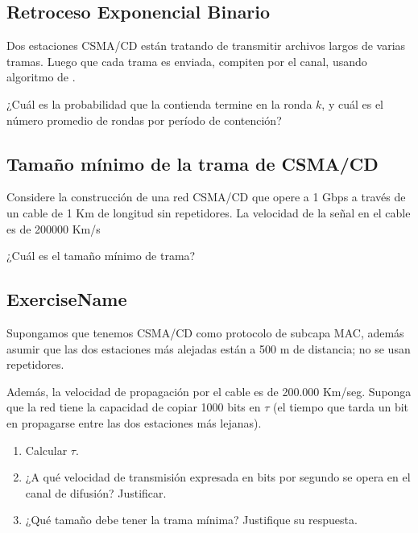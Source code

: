 \documentclass[12pt]{report}
\begin{document}
\begin{exer}
\subsection{Retroceso Exponencial Binario \sthree}
Dos estaciones CSMA/CD están tratando de transmitir archivos largos de varias tramas. Luego que cada trama es enviada, compiten por el canal, usando algoritmo de .

¿Cuál es la probabilidad que la contienda termine en la ronda $k$, y cuál es el número promedio de rondas por período de contención?
\end{exer}

\begin{exer}
\subsection{Tamaño mínimo de la trama de CSMA/CD \sthree}
Considere la construcción de una red CSMA/CD que opere a 1 Gbps a través de un
cable de 1 Km de longitud sin repetidores. La velocidad de la señal en el cable es de 200000 Km/s

¿Cuál es el tamaño mínimo de trama?
\end{exer}

\begin{exer}
\subsection{ExerciseName \sone}
Supongamos que tenemos CSMA/CD como protocolo de subcapa MAC, además asumir que las dos estaciones más alejadas están a 500 m de distancia; no se usan repetidores. 

Además, la velocidad de propagación por el cable es de 200.000 Km/seg. Suponga que la red
tiene la capacidad de copiar 1000 bits en $\tau$ (el tiempo que tarda un bit en propagarse entre las
dos estaciones más lejanas).

\begin{enumerate}
\item Calcular $\tau$.
\item ¿A qué velocidad de transmisión expresada en bits por segundo se opera en el canal de difusión? Justificar.
\item ¿Qué tamaño debe tener la trama mínima? Justifique su respuesta. 
\end{enumerate}
\end{exer}
\end{document}
